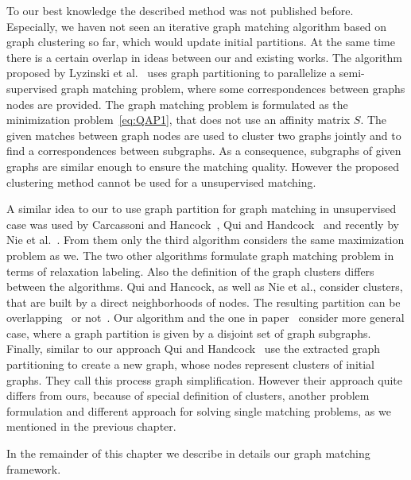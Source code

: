 To our best knowledge the described method was not published before. Especially, we haven not seen an iterative graph matching algorithm based on graph clustering so far, which would update initial partitions. At the same time there is a certain overlap in ideas between our and existing works. The algorithm proposed by Lyzinski et al.~\cite{Lyzinski2015} uses graph partitioning to parallelize a semi-supervised graph matching problem, where some correspondences between graphs nodes are provided. The graph matching problem is formulated as the minimization problem~\eqref{eq:QAP1}, that does not use an affinity matrix $S$. The given matches between graph nodes are used to cluster two graphs jointly and to find a correspondences between subgraphs. As a consequence, subgraphs of given graphs are similar enough to ensure the matching quality. However the proposed clustering method cannot be used for a unsupervised matching.

 A similar idea to our to use graph partition for graph matching in unsupervised case was used by Carcassoni and Hancock~\cite{Hancock_ModalClusters}, Qui and Handcock~\cite{Hancock_GM_SpectralPart} and recently by Nie et al.~\cite{CliqueGraph_CVPR2015}. From them only the third algorithm considers the same maximization problem as we. The two other algorithms formulate graph matching problem in terms of relaxation labeling. Also the definition of the graph clusters differs between the algorithms. Qui and Hancock, as well as Nie et al., consider clusters, that are built by a direct neighborhoods of nodes. The resulting partition can be overlapping~\cite{CliqueGraph_CVPR2015} or not~\cite{Hancock_GM_SpectralPart}. Our algorithm and the one in paper~\cite{Hancock_ModalClusters} consider more general case, where a graph partition is given by a disjoint set of graph subgraphs.
Finally, similar to our approach Qui and Handcock~\cite{Hancock_GM_SpectralPart} use the extracted graph partitioning to create a new graph, whose nodes represent clusters of initial graphs. They call this process graph simplification. However their approach quite differs from ours, because of special definition of clusters, another problem formulation and different approach for solving single matching problems, as we mentioned in the previous chapter.

In the remainder of this chapter we describe in details our graph matching framework.

